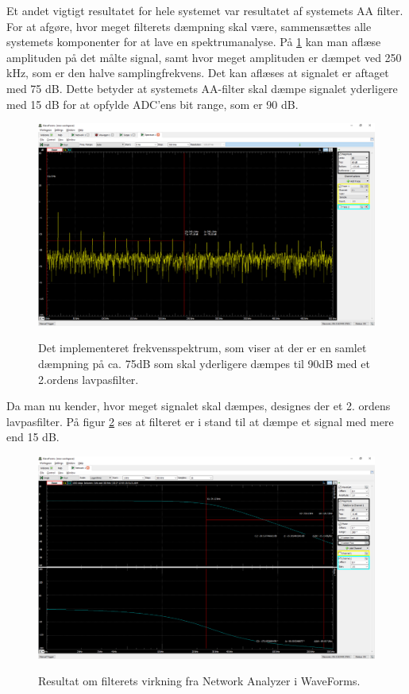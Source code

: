 \pagebreak 

Et andet vigtigt resultatet for hele systemet var resultatet af systemets AA filter. For at afgøre, hvor meget filterets dæmpning skal være, sammensættes alle systemets komponenter for at lave en spektrumanalyse. På \ref{fig:aaspectrum1} kan man aflæse amplituden på det målte signal, samt hvor meget amplituden er dæmpet ved 250 kHz, som er den halve samplingfrekvens. Det kan aflæses at signalet er aftaget med 75 dB. Dette betyder at systemets AA-filter skal dæmpe signalet yderligere med 15 dB  for at opfylde ADC'ens bit range, som er 90 dB.   

       
\begin{figure}[H] 
\centering
{\includegraphics[width=\linewidth]
{Figure/aaspectrum1}}
\caption{Det implementeret frekvensspektrum, som viser at der er en samlet dæmpning på ca. 75dB som skal yderligere dæmpes til 90dB med et 2.ordens lavpasfilter.}
\label{fig:aaspectrum1}
\end{figure}

\pagebreak

Da man nu kender, hvor meget signalet skal dæmpes, designes der et 2. ordens lavpasfilter. På figur \ref{fig:aafiltermodultest} ses at filteret er i stand til at dæmpe et signal med mere end 15 dB. 


\begin{figure}[H] 
\centering
{\includegraphics[width=\linewidth]
{Figure/aafiltermodultest}}
\caption{Resultat om filterets virkning fra Network Analyzer i WaveForms.}
\label{fig:aafiltermodultest}
\end{figure}




